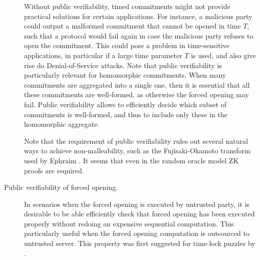 \begin{description}
	Without public verifiability, timed commitments might not provide practical solutions for certain applications. For instance, a malicious party could output a malformed commitment that cannot be opened in time $T$, such that a protocol would fail again in case the malicious party refuses to open the commitment. This could pose a problem in time-sensitive applications, in particular if a large time parameter $T$ is used, and also give rise do Denial-of-Service attacks.
	Note that public verifiability is particularly relevant for homomorphic commitments. When many commitments are aggregated into a single one, then it is essential that all these commitments are well-formed, as otherwise the forced opening may fail. Public verifiability allows to efficiently decide which subset of commitments is well-formed, and thus to include only these in the homomorphic aggregate.

	Note that the requirement of public verifiability rules out several natural ways to achieve non-malleability, such as the Fujisaki-Okamoto transform \cite{C:FujOka99,JC:FujOka13} used by Ephraim \etal \cite{EPRINT:EFKP20a}. It seems that even in the random oracle model ZK proofs are required.
	\item[Public verifiability of forced opening.] In scenarios when the forced opening is executed by untrusted party, it is desirable to be able efficiently check that forced opening has been executed properly without redoing an expensive sequential computation. This particularly useful when the forced opening computation is outsourced to untrusted server. This property was first suggested for time-lock puzzles by \cite{EPRINT:EFKP20a}. 
\end{description}









